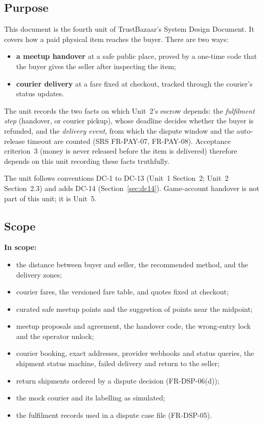 \documentclass[11pt,a4paper]{article}
\begin{document}
\subsection{Purpose}
This document is the fourth unit of TrustBazaar's System Design Document. It covers how a paid physical item reaches the buyer. There are two ways:
\begin{itemize}[nosep]
  \item \textbf{a meetup handover} at a safe public place, proved by a one-time code that the buyer gives the seller after inspecting the item;
  \item \textbf{courier delivery} at a fare fixed at checkout, tracked through the courier's status updates.
\end{itemize}
The unit records the two facts on which Unit~2's escrow depends: the \emph{fulfilment step} (handover, or courier pickup), whose deadline decides whether the buyer is refunded, and the \emph{delivery event}, from which the dispute window and the auto-release timeout are counted (SRS FR-PAY-07, FR-PAY-08). Acceptance criterion~3 (money is never released before the item is delivered) therefore depends on this unit recording these facts truthfully.

The unit follows conventions DC-1 to DC-13 (Unit~1 Section~2; Unit~2 Section~2.3) and adds DC-14 (Section~\ref{sec:dc14}). Game-account handover is not part of this unit; it is Unit~5.

\subsection{Scope}
\textbf{In scope:}
\begin{itemize}[nosep]
  \item the distance between buyer and seller, the recommended method, and the delivery zones;
  \item courier fares, the versioned fare table, and quotes fixed at checkout;
  \item curated safe meetup points and the suggestion of points near the midpoint;
  \item meetup proposals and agreement, the handover code, the wrong-entry lock and the operator unlock;
  \item courier booking, exact addresses, provider webhooks and status queries, the shipment status machine, failed delivery and return to the seller;
  \item return shipments ordered by a dispute decision (FR-DSP-06(d));
  \item the mock courier and its labelling as simulated;
  \item the fulfilment records used in a dispute case file (FR-DSP-05).
\end{itemize}
\end{document}
